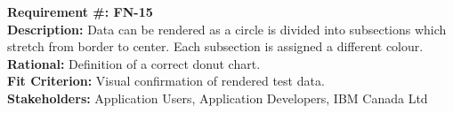 \documentclass[12pt, titlepage]{article}
\begin{document}
\begin{flushleft}
\textbf{Requirement \#: FN-15} \\
\textbf{Description:} Data can be rendered as a circle is divided into subsections which stretch from border to center. Each subsection is assigned a different colour.  \\
\textbf{Rational:} Definition of a correct donut chart. \\
\textbf{Fit Criterion:} Visual confirmation of rendered test data. \\
\textbf{Stakeholders:} Application Users, Application Developers, IBM Canada Ltd\\
\end{flushleft}
\end{document}
